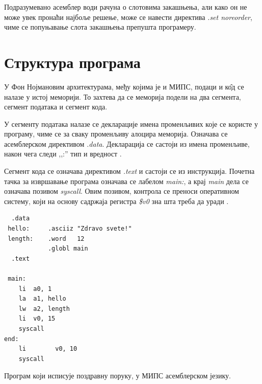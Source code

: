 \documentclass[12pt,oneside]{memoir}
\begin{document}
Подразумевано асемблер води рачуна о слотовима закашњења, али како он не може увек пронаћи најбоље решење, може се навести директива \textit{.set noreorder}, чиме се попуњавање слота закашњења препушта програмеру.
\section{Структура програма}
\label{struktura}
У Фон Нојмановим архитектурама, међу којима је и МИПС, подаци и к\^{о}д се налазе у истој меморији. То захтева да се меморија подели на два сегмента, сегмент података и сегмент кода.

У сегменту података налазе се декларације имена променљивих које се користе у програму, чиме се за сваку променљиву алоцира меморија. Означава се асемблерском директивом \textit{.data}. Декларација се састоји из имена променљиве, након чега следи ,,:'' тип и вредност \cite{mips}.

Сегмент кода се означава директивом \textit{.text} и састоји се из инструкција. Почетна тачка за извршавање програма означава се лабелом \textit{main:}, а крај \textit{main} дела се означава позивом \textit{syscall}. Овим позивом, контрола се преноси оперативном систему, који на основу садржаја регистра \textit{\$v0} зна шта треба да уради \cite{mips}.

\begin{listing}
\begin{verbatim}
  .data
 hello:     .asciiz "Zdravo svete!"
 length:    .word   12
            .globl main
  .text

 main:
    li  a0, 1
    la  a1, hello
    lw  a2, length
    li  v0, 15
    syscall
end:
    li        v0, 10
    syscall
\end{verbatim}
\caption{Програм који исписује поздравну поруку, у МИПС асемблерском језику.}
\label{asmkod}
\end{listing}
\end{document}
